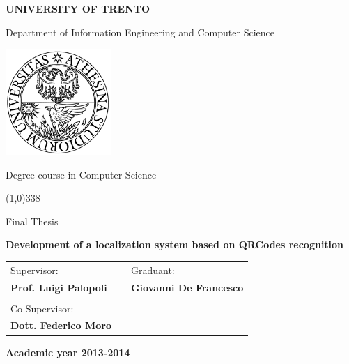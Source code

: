 \begin{titlepage}
  \pagestyle{empty}

  \begin{center}
    {\bfseries\Large {\huge U}NIVERSITY OF {\huge T}RENTO}

    \vspace{0.2cm}

    {\large Department of Information Engineering and Computer Science}

    \vspace{0.5cm}

    \begin{center}
      \includegraphics[width=0.3\textwidth]{img/logo_unitn.png}
    \end{center}

    \vspace{0.5cm}

    {\Large Degree course in Computer Science}

    \vspace{0.2cm}
    \line(1,0){338}
    \vspace{0.5cm}

    {\Large Final Thesis}

    \vspace{2.0cm}

    {\Large \bfseries {Development of a localization system based on QRCodes recognition}}

    \vspace{0.3cm}
    

    \large
    \begin{center}
      \begin{tabular}{lcl}
        Supervisor: & \hspace{4cm} &  \hspace{1.5cm} Graduant: \\
        {\bfseries Prof. Luigi Palopoli} & \hspace{2cm} & {\bfseries Giovanni De Francesco } \\ \\
        Co-Supervisor: \\ {\bfseries Dott. Federico Moro}
      \end{tabular}
    \end{center}
    \vspace{2.0cm}

    {\large \bfseries Academic year 2013-2014}
    \vfill

  \end{center}

\end{titlepage}
